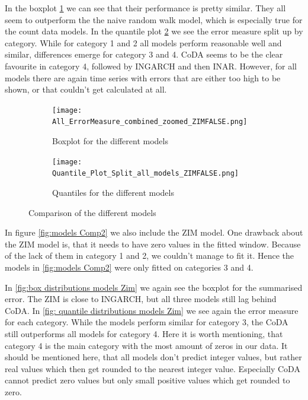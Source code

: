 In the boxplot \ref{fig:box distributions models} we can see that their performance is pretty similar. They all seem to outperform the the naive random walk model, which is especially true for the count data models. 
In the quantile plot \ref{fig: quantile distributions models} we see the error measure split up by category. While for category 1 and 2 all models perform reasonable well and similar, differences emerge for category 3 and 4. CoDA seems to be the clear favourite in category 4, followed by INGARCH and then INAR. However, for all models there are again time series with errors that are either too high to be shown, or that couldn't get calculated at all. 
\begin{figure}[htb!]
\centering
\begin{subfigure}[b]{0.8\textwidth}
\texttt{[image: All\_ErrorMeasure\_combined\_zoomed\_ZIMFALSE.png]}
\caption{Boxplot for the different models}
\label{fig:box distributions models}
\end{subfigure}
\hfill
\begin{subfigure}[b]{0.8\textwidth}
\texttt{[image: Quantile\_Plot\_Split\_all\_models\_ZIMFALSE.png]}
\caption{Quantiles for the different models}
\label{fig: quantile distributions models}
\end{subfigure}
\hfill
\caption{Comparison of the different models}
\label{fig:models Comp1}
\end{figure}

In figure \ref{fig:models Comp2} we also include the ZIM model. One drawback about the ZIM model is, that it needs to have zero values in the fitted window. Because of the lack of them in category 1 and 2, we couldn't manage to fit it. Hence the models in \ref{fig:models Comp2} were only fitted on categories 3 and 4. 

In \ref{fig:box distributions models Zim} we again see the boxplot for the summarised error. The ZIM is close to INGARCH, but all three models still lag behind CoDA. In \ref{fig: quantile distributions models Zim} we see again the error measure for each category. While the models perform similar for category 3, the CoDA still outperforms all models for category 4. Here it is worth mentioning, that category 4 is the main category with the most amount of zeros in our data. It should be mentioned here, that all models don't predict integer values, but rather real values which then get rounded to the nearest integer value. Especially CoDA cannot predict zero values but only small positive values which get rounded to zero.

